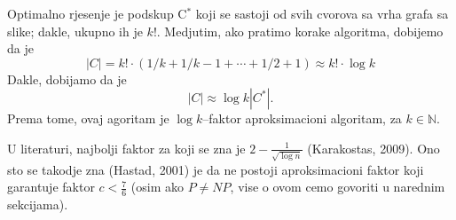 \documentclass[a4paper, utf8, 11pt, colorlinks]{article}
\begin{document}
  
  
  Optimalno rjesenje je podskup C$^*$ koji se sastoji od svih cvorova sa vrha grafa sa slike; dakle, ukupno ih je $k!$. Medjutim, ako pratimo korake algoritma, dobijemo 
  da je $$|C| = k!\cdot( 1/k + 1/k-1 + \cdots + 1/2 + 1) \approx k! \cdot \log k$$
  Dakle, dobijamo da je 
  $$   |C| \approx \log k |C^*|.$$ Prema tome, ovaj agoritam je $\log k$--faktor aproksimacioni algoritam, za $k \in \mathbb{N}$. 
  
  \noindent U literaturi, najbolji faktor za koji se zna je $2 - \frac{1}{\sqrt{\log n}}$ (Karakostas, 2009).
  Ono sto se takodje zna (Hastad, 2001) je da ne postoji aproksimacioni faktor 
  koji garantuje faktor $c < \frac{7}{6}$ (osim ako $P \neq NP$, vise o ovom cemo govoriti u narednim sekcijama). 
  
\end{document}
